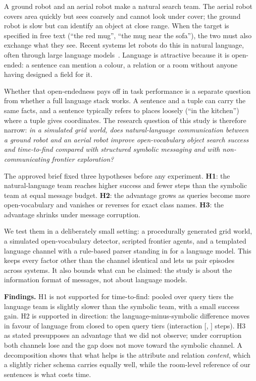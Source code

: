 A ground robot and an aerial robot make a natural search team. The aerial robot covers area quickly but sees coarsely and cannot look under cover; the ground robot is slow but can identify an object at close range. When the target is specified in free text (``the red mug'', ``the mug near the sofa''), the two must also exchange what they see. Recent systems let robots do this in natural language, often through large language models~\cite{cladera2025air,yu2024mhrc,chen2023scalable,zhang2023building}. Language is attractive because it is open-ended: a sentence can mention a colour, a relation or a room without anyone having designed a field for it.

Whether that open-endedness pays off in task performance is a separate question from whether a full language stack works. A sentence and a tuple can carry the same facts, and a sentence typically refers to places loosely (``in the kitchen'') where a tuple gives coordinates. The research question of this study is therefore narrow: \emph{in a simulated grid world, does natural-language communication between a ground robot and an aerial robot improve open-vocabulary object search success and time-to-find compared with structured symbolic messaging and with non-communicating frontier exploration?}

The approved brief fixed three hypotheses before any experiment. \textbf{H1}: the natural-language team reaches higher success and fewer steps than the symbolic team at equal message budget. \textbf{H2}: the advantage grows as queries become more open-vocabulary and vanishes or reverses for exact class names. \textbf{H3}: the advantage shrinks under message corruption.

We test them in a deliberately small setting: a procedurally generated grid world, a simulated open-vocabulary detector, scripted frontier agents, and a templated language channel with a rule-based parser standing in for a language model. This keeps every factor other than the channel identical and lets us pair episodes across systems. It also bounds what can be claimed: the study is about the information format of messages, not about language models.

\textbf{Findings.} H1 is not supported for time-to-find: pooled over query tiers the language team is slightly slower than the symbolic team, with a small success gain. H2 is supported in direction: the language-minus-symbolic difference moves in favour of language from closed to open query tiers (interaction  [, ] steps). H3 as stated presupposes an advantage that we did not observe; under corruption both channels lose and the gap does not move toward the symbolic channel. A decomposition shows that what helps is the attribute and relation \emph{content}, which a slightly richer schema carries equally well, while the room-level reference of our sentences is what costs time.

